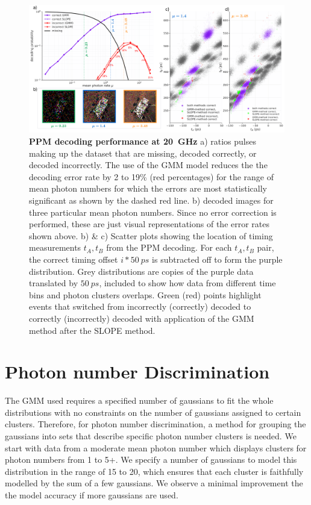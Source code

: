 \documentclass[11pt]{caltech_thesis} %
\begin{document}
\hypertarget{fig:decoding_20GHz}{%
\begin{figure}
\centering
\includegraphics[width=1\textwidth,height=\textheight]{./chapter_04/figs/ppm_decoding_20GHz_light.pdf}
\caption[{PPM decoding performance at 20~GHz}]{\textbf{PPM decoding performance at 20~GHz} a) ratios pulses making up the dataset that are missing, decoded correctly, or decoded incorrectly. The use of the GMM model reduces the the decoding error rate by 2 to 19\% (red percentages) for the range of mean photon numbers for which the errors are most statistically significant as shown by the dashed red line. b) decoded images for three particular mean photon numbers. Since no error correction is performed, these are just visual representations of the error rates shown above. b) \& c) Scatter plots showing the location of timing measurements $t_A, t_B$ from the PPM decoding. For each $t_A,t_B$ pair, the correct timing offset $i*50~ps$ is subtracted off to form the purple distribution. Grey distributions are copies of the purple data translated by $50~ps$, included to show how data from different time bins and photon clusters overlaps. Green (red) points highlight events that switched from incorrectly (correctly) decoded to correctly (incorrectly) decoded with application of the GMM method after the SLOPE method.}
\label{fig:decoding_20GHz}
\end{figure}
}

\hypertarget{photon-number-discrimination}{%
\section{Photon number Discrimination}\label{photon-number-discrimination}}

The GMM used requires a specified number of gaussians to fit the whole distributions with no constraints on the number of gaussians assigned to certain clusters. Therefore, for photon number discrimination, a method for grouping the gaussians into sets that describe specific photon number clusters is needed. We start with data from a moderate mean photon number which displays clusters for photon numbers from 1 to 5+. We specify a number of gaussians to model this distribution in the range of 15 to 20, which ensures that each cluster is faithfully modelled by the sum of a few gaussians. We observe a minimal improvement the the model accuracy if more gaussians are used.
\end{document}

